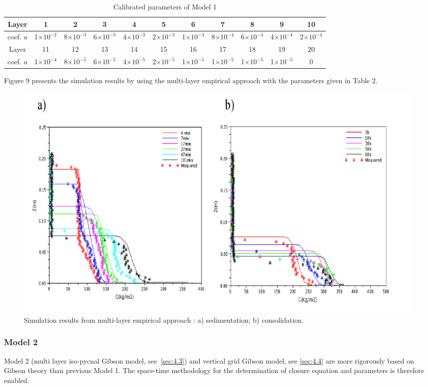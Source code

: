 \begin{table}
\begin{center}
   \caption{\label{tab:2} Calibrated parameters of Model 1}
\begin{tabular}{|c|c|c|c|c|c|c|c|c|c|c|}
  \hline
Layer  & 1 & 2 & 3 & 4 & 5 & 6 & 7 & 8 & 9 & 10 \\  
  \hline
coef. $a$ & 1$\times 10^{-2}$ & 8$\times 10^{-3}$ & 6$\times 10^{-3}$ & 4$\times 10^{-3}$ & 2$\times 10^{-3}$ & 1$\times 10^{-3}$ & 8$\times 10^{-4}$ & 6$\times 10^{-4}$ & 4$\times 10^{-4}$ & 2$\times 10^{-4}$ \\
  \hline
Layer  & 11 & 12 & 13 & 14 & 15 & 16 & 17 & 18 & 19 & 20 \\
 \hline
coef. $a$ & 1$\times 10^{-4}$ & 8$\times 10^{-5}$ & 6$\times 10^{-5}$ & 4$\times 10^{-5}$ & 2$\times 10^{-5}$ & 1$\times 10^{-5}$ & 1$\times 10^{-5}$ & 1$\times 10^{-5}$ & 1$\times 10^{-5}$ & 0 \\
  \hline  
\end{tabular}
\end{center}
\end{table}

Figure 9 presents the simulation results by using the multi-layer empirical
approach with the parameters given in Table 2.\newline

\begin{figure}[H]
\begin{center}
\includegraphics[scale=0.1,angle=0]{graphics/fig9.png}
\caption{Simulation results from multi-layer empirical approach : a)
sedimentation; b) consolidation.}\label{fig:9}
\end{center}
\end{figure}

\subsubsection*{Model 2}
Model 2 (multi layer iso-pycnal Gibson model, see~\ref{sec:4.3}) and vertical grid
Gibson model, see \ref{sec:4.4} are more rigorously based on Gibson theory than
previous Model 1. The space-time methodology for the determination of
closure equation and parameters is therefore enabled.

